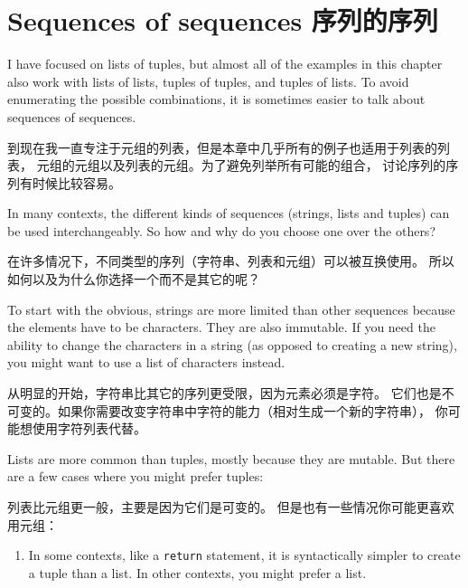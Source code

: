 \documentclass[10pt]{book}
\begin{document}
\begin{CJK}{UTF8}{gbsn}
\begin{exercise}

\end{exercise}


\section{Sequences of sequences 序列的序列}

I have focused on lists of tuples, but almost all of the examples in
this chapter also work with lists of lists, tuples of tuples, and
tuples of lists.  To avoid enumerating the possible combinations, it
is sometimes easier to talk about sequences of sequences.

到现在我一直专注于元组的列表，但是本章中几乎所有的例子也适用于列表的列表，
元组的元组以及列表的元组。为了避免列举所有可能的组合，
讨论序列的序列有时候比较容易。

In many contexts, the different kinds of sequences (strings, lists and
tuples) can be used interchangeably.  So how and why do you choose one
over the others?

在许多情况下，不同类型的序列（字符串、列表和元组）可以被互换使用。
所以如何以及为什么你选择一个而不是其它的呢？

To start with the obvious, strings are more limited than other
sequences because the elements have to be characters.  They are
also immutable.  If you need the ability to change the characters
in a string (as opposed to creating a new string), you might
want to use a list of characters instead.

从明显的开始，字符串比其它的序列更受限，因为元素必须是字符。
它们也是不可变的。如果你需要改变字符串中字符的能力（相对生成一个新的字符串），
你可能想使用字符列表代替。

Lists are more common than tuples, mostly because they are mutable.
But there are a few cases where you might prefer tuples:

列表比元组更一般，主要是因为它们是可变的。
但是也有一些情况你可能更喜欢用元组：

\begin{enumerate}

\item In some contexts, like a {\tt return} statement, it is
syntactically simpler to create a tuple than a list.  In other
contexts, you might prefer a list.


\end{enumerate}
\end{CJK}
\end{document}
